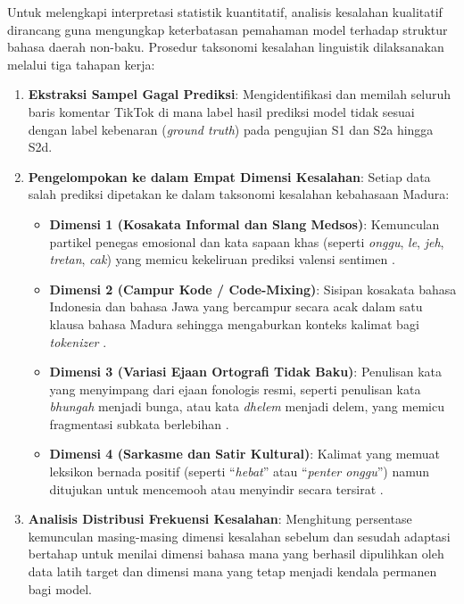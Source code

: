 Untuk melengkapi interpretasi statistik kuantitatif, analisis kesalahan kualitatif dirancang guna mengungkap keterbatasan pemahaman model terhadap struktur bahasa daerah non-baku. Prosedur taksonomi kesalahan linguistik dilaksanakan melalui tiga tahapan kerja:
\begin{enumerate}
    \item \textbf{Ekstraksi Sampel Gagal Prediksi}: Mengidentifikasi dan memilah seluruh baris komentar TikTok di mana label hasil prediksi model tidak sesuai dengan label kebenaran (\textit{ground truth}) pada pengujian S1 dan S2a hingga S2d.
    \item \textbf{Pengelompokan ke dalam Empat Dimensi Kesalahan}: Setiap data salah prediksi dipetakan ke dalam taksonomi kesalahan kebahasaan Madura:
    \begin{itemize}
        \item \textbf{Dimensi 1 (Kosakata Informal dan Slang Medsos)}: Kemunculan partikel penegas emosional dan kata sapaan khas (seperti \textit{onggu}, \textit{le}, \textit{jeh}, \textit{tretan}, \textit{cak}) yang memicu kekeliruan prediksi valensi sentimen \citep{arifin2026heuristic}.
        \item \textbf{Dimensi 2 (Campur Kode / Code-Mixing)}: Sisipan kosakata bahasa Indonesia dan bahasa Jawa yang bercampur secara acak dalam satu klausa bahasa Madura sehingga mengaburkan konteks kalimat bagi \textit{tokenizer} \citep{syauri2026analisis}.
        \item \textbf{Dimensi 3 (Variasi Ejaan Ortografi Tidak Baku)}: Penulisan kata yang menyimpang dari ejaan fonologis resmi, seperti penulisan kata \textit{bhungah} menjadi bunga, atau kata \textit{dhelem} menjadi delem, yang memicu fragmentasi subkata berlebihan \citep{arifin2026heuristic, firmansyah2021klasifikasi}.
        \item \textbf{Dimensi 4 (Sarkasme dan Satir Kultural)}: Kalimat yang memuat leksikon bernada positif (seperti ``\textit{hebat}'' atau ``\textit{penter onggu}'') namun ditujukan untuk mencemooh atau menyindir secara tersirat \citep{luther2026analisis, saputra2026reaksi}.
    \end{itemize}
    \item \textbf{Analisis Distribusi Frekuensi Kesalahan}: Menghitung persentase kemunculan masing-masing dimensi kesalahan sebelum dan sesudah adaptasi bertahap untuk menilai dimensi bahasa mana yang berhasil dipulihkan oleh data latih target dan dimensi mana yang tetap menjadi kendala permanen bagi model.
\end{enumerate}

